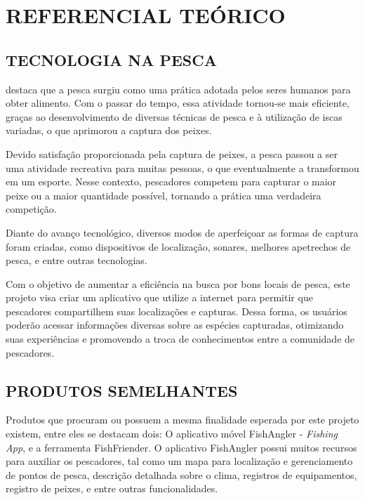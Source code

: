 
\chapter{REFERENCIAL TEÓRICO}
\label{chap:referencialTeorico}

\section{TECNOLOGIA NA PESCA}
\label{sec:referenciasDeDesenvolvimento}

 destaca que a pesca surgiu como uma prática adotada pelos seres humanos para obter alimento. Com o passar do tempo, essa atividade tornou-se mais eficiente, graças ao desenvolvimento de diversas técnicas de pesca e à utilização de iscas variadas, o que aprimorou a captura dos peixes.

Devido satisfação proporcionada pela captura de peixes, a pesca passou a ser uma atividade recreativa para muitas pessoas, o que eventualmente a transformou em um esporte. Nesse contexto, pescadores competem para capturar o maior peixe ou a maior quantidade possível, tornando a prática uma verdadeira competição.

Diante do avanço tecnológico, diversos modos de aperfeiçoar as formas de captura foram criadas, como dispositivos de localização, sonares, melhores apetrechos de pesca, e entre outras tecnologias.

Com o objetivo de aumentar a eficiência na busca por bons locais de pesca, este projeto visa criar um aplicativo que utilize a internet para permitir que pescadores compartilhem suas localizações e capturas. Dessa forma, os usuários poderão acessar informações diversas sobre as espécies capturadas, otimizando suas experiências e promovendo a troca de conhecimentos entre a comunidade de pescadores.

\section{PRODUTOS SEMELHANTES}
\label{sec:referenciasDeDesenvolvimento}

Produtos que procuram ou possuem a mesma finalidade esperada por este projeto existem, entre eles se destacam dois: O aplicativo móvel FishAngler - \textit{Fishing App}, e a ferramenta FishFriender. O aplicativo FishAngler possui muitos recursos para auxiliar os pescadores, tal como um mapa para localização e gerenciamento de pontos de pesca, descrição detalhada sobre o clima, registros de equipamentos, registro de peixes, e entre outras funcionalidades.

